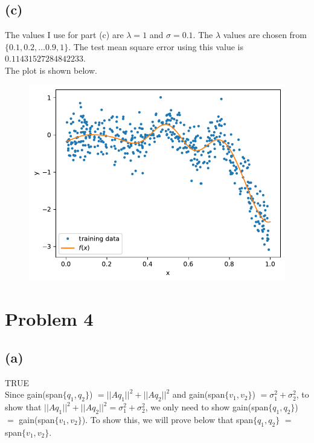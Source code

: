 \documentclass[11pt]{article}
\begin{document}
\subsection*{(c)}
The values I use for part (c) are $\lambda = 1$ and $\sigma = 0.1$. The $\lambda$ values are chosen from $\{0.1,0.2, \ldots 0.9,1\}$.
 The test mean square error using this value is $0.11431527284842233$. \\
The plot is shown below. \\
\begin{figure}[H]
    \centering
    \includegraphics[scale=0.8]{images/hw4regc.pdf}
\end{figure}

\section*{Problem 4}
\subsection*{(a)}
TRUE\\

Since gain(span$\{q_1,q_2\}$) $=||Aq_1||^2+||Aq_2||^2$ and gain(span$\{v_1,v_2\}$) $=\sigma_1^2 + \sigma_2^2$, to show that $||Aq_1||^2+||Aq_2||^2 = \sigma_1^2 + \sigma_2^2$, we only need to show gain(span$\{q_1,q_2\}$) $=$ gain(span$\{v_1,v_2\}$). To show this, we will prove below that span$\{q_1,q_2\}$ $=$ span$\{v_1,v_2\}$. \\
\end{document}
